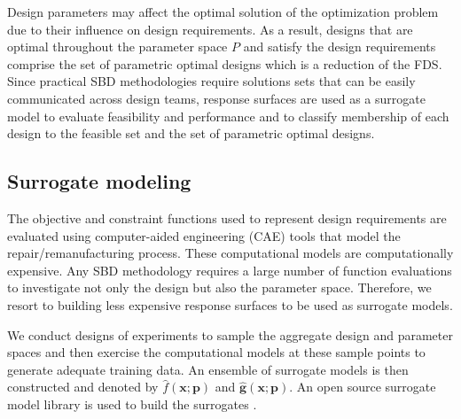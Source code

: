 Design parameters may affect the optimal solution of the optimization problem due to their influence on design requirements. As a result, designs that are optimal throughout the parameter space $\mathit{P}$ and satisfy the design requirements comprise the set of parametric optimal designs which is a reduction of the \ac{FDS}. Since practical \ac{SBD} methodologies require solutions sets that can be easily communicated across design teams, response surfaces are used as a surrogate model to evaluate feasibility and performance and to classify membership of each design to the feasible set and the set of parametric optimal designs. 

\subsection{Surrogate modeling} \label{subsec:RSM}

The objective and constraint functions used to represent design requirements are evaluated using computer-aided engineering (CAE) tools that model the repair/remanufacturing process.  
These computational models are computationally expensive. Any SBD methodology requires a large number of function evaluations to investigate not only the design but also the parameter space. Therefore, we resort to building less expensive response surfaces to be used as surrogate models.

We conduct designs of experiments to sample the aggregate design and parameter spaces and then exercise the computational models at these sample points to generate adequate training data. An ensemble of surrogate models is then constructed and denoted by $\hat{f}(\mathbf{x};{\mathbf{p}})$ and $\hat{\mathbf{g}}(\mathbf{x};{\mathbf{p}})$. An open source surrogate model library is used to build the surrogates \cite{Talgorn2018,Lophaven2002}.


